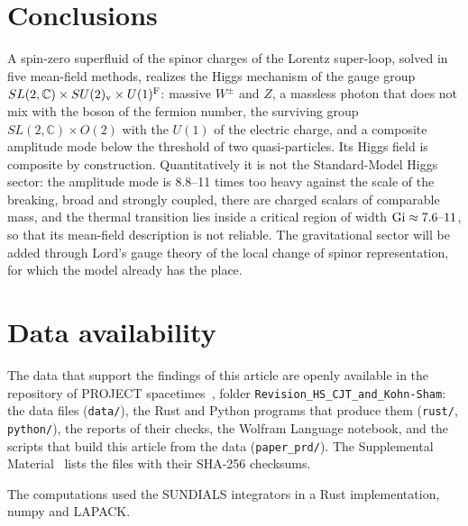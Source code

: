 \documentclass[aps,prd,twocolumn,superscriptaddress,nofootinbib,floatfix,longbibliography]{revtex4-2}
\begin{document}
\section{Conclusions}
\label{sec:conclusions}

A spin-zero superfluid of the spinor charges of the Lorentz super-loop, solved in five mean-field methods, realizes the
Higgs mechanism of the gauge group $SL(2,\mathbb C)\times SU(2)_{\rm v}\times U(1)^{\rm F}$: massive $W^\pm$ and $Z$, a massless
photon that does not mix with the boson of the fermion number, the surviving group $SL(2,\mathbb C)\times O(2)$ with the $U(1)$
of the electric charge, and a composite amplitude mode below the threshold of two quasi-particles. Its Higgs field is
composite by construction. Quantitatively it is not the Standard-Model Higgs sector: the amplitude mode is 8.8\mbox{--}11
times too heavy against the scale of the breaking, broad and strongly coupled, there are charged scalars of comparable
mass, and the thermal transition lies inside a critical region of width ${\rm Gi}\approx7.6\mbox{--}11$, so that its
mean-field description is not reliable. The gravitational sector will be added through Lord's gauge theory of the local
change of spinor representation, for which the model already has the place.

\section*{Data availability}

The data that support the findings of this article are openly available in the repository of PROJECT
spacetimes~\cite{Repo}, folder \texttt{Revision\_HS\_CJT\_and\_Kohn-Sham}: the data files (\texttt{data/}), the Rust and Python
programs that produce them (\texttt{rust/}, \texttt{python/}), the reports of their checks, the Wolfram Language notebook, and
the scripts that build this article from the data (\texttt{paper\_prd/}). The Supplemental Material~\cite{SM} lists the files
with their SHA-256 checksums.

\begin{acknowledgments}
The computations used the SUNDIALS integrators in a Rust implementation, numpy and LAPACK.
\end{acknowledgments}


\end{document}
